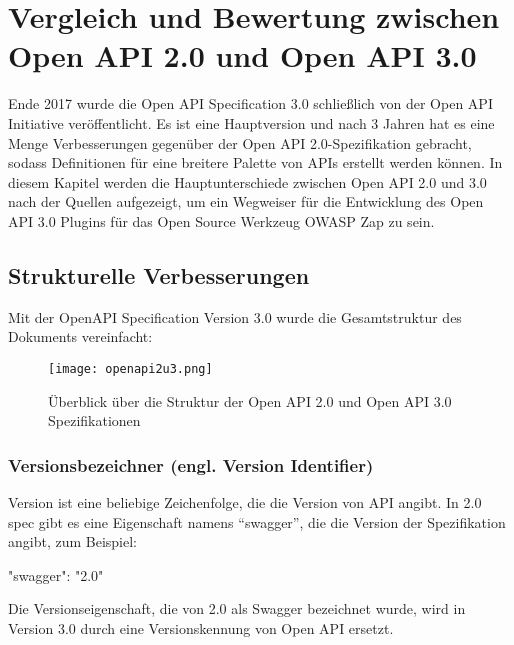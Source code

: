 \chapter{Vergleich und Bewertung zwischen Open API 2.0 und Open API 3.0}
\label{cha:k6}
Ende 2017 wurde die Open API Specification 3.0 schließlich von der Open API Initiative veröffentlicht. Es ist eine Hauptversion und nach 3 Jahren hat es eine Menge Verbesserungen gegenüber der Open API 2.0-Spezifikation gebracht, sodass Definitionen für eine breitere Palette von APIs erstellt werden können. In diesem Kapitel werden die Hauptunterschiede zwischen Open API 2.0 und 3.0 nach der Quellen\cite{swagger20Github, openapi20Github} aufgezeigt, um ein Wegweiser für die Entwicklung des Open API 3.0 Plugins für das Open Source Werkzeug OWASP Zap zu sein.

\section{Strukturelle Verbesserungen}

Mit der OpenAPI Specification Version 3.0 wurde die Gesamtstruktur des Dokuments vereinfacht:

\newpage

\begin{figure}[h]
	\centering
	\texttt{[image: openapi2u3.png]}
	\caption{Überblick über die Struktur der Open API 2.0 und Open API 3.0 Spezifikationen\cite{openapi2u317}}
	\label{openapi2u317-1}
\end{figure}

\subsection{Versionsbezeichner (engl. Version Identifier)}

Version ist eine beliebige Zeichenfolge, die die Version von API angibt\cite{openapiversion17}. In 2.0 spec gibt es eine Eigenschaft namens "`swagger"', die die Version der Spezifikation angibt, zum Beispiel:\\

\begin{LaTeXCode}[caption={Version von Swagger},captionpos=b, label=LaTeXCode:swagger2.0-1][numbers=none]
"swagger": "2.0"\\
\end{LaTeXCode}

Die Versionseigenschaft, die von 2.0 als Swagger bezeichnet wurde, wird in Version 3.0 durch eine Versionskennung von Open API ersetzt.\\

